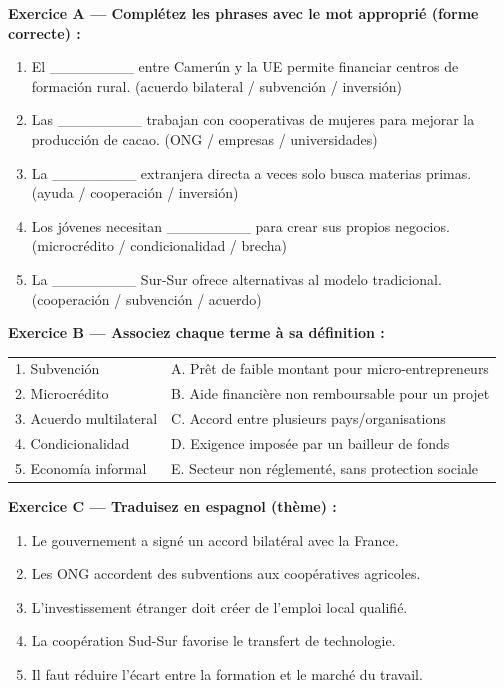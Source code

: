 \documentclass[11pt]{article}
\begin{document}
\begin{exoresolu}
\textbf{Exercice A — Complétez les phrases avec le mot approprié (forme correcte) :}
\begin{enumerate}
\item El \_\_\_\_\_\_\_\_ entre Camerún y la UE permite financiar centros de formación rural. (acuerdo bilateral / subvención / inversión)
\item Las \_\_\_\_\_\_\_\_ trabajan con cooperativas de mujeres para mejorar la producción de cacao. (ONG / empresas / universidades)
\item La \_\_\_\_\_\_\_\_ extranjera directa a veces solo busca materias primas. (ayuda / cooperación / inversión)
\item Los jóvenes necesitan \_\_\_\_\_\_\_\_ para crear sus propios negocios. (microcrédito / condicionalidad / brecha)
\item La \_\_\_\_\_\_\_\_ Sur-Sur ofrece alternativas al modelo tradicional. (cooperación / subvención / acuerdo)
\end{enumerate}

\textbf{Exercice B — Associez chaque terme à sa définition :}
\begin{center}
\begin{tabular}{|l|l|}
\hline
1. Subvención & A. Prêt de faible montant pour micro-entrepreneurs \\
2. Microcrédito & B. Aide financière non remboursable pour un projet \\
3. Acuerdo multilateral & C. Accord entre plusieurs pays/organisations \\
4. Condicionalidad & D. Exigence imposée par un bailleur de fonds \\
5. Economía informal & E. Secteur non réglementé, sans protection sociale \\
\hline
\end{tabular}
\end{center}

\textbf{Exercice C — Traduisez en espagnol (thème) :}
\begin{enumerate}
\item Le gouvernement a signé un accord bilatéral avec la France.
\item Les ONG accordent des subventions aux coopératives agricoles.
\item L'investissement étranger doit créer de l'emploi local qualifié.
\item La coopération Sud-Sur favorise le transfert de technologie.
\item Il faut réduire l'écart entre la formation et le marché du travail.
\end{enumerate}


\end{exoresolu}
\end{document}
